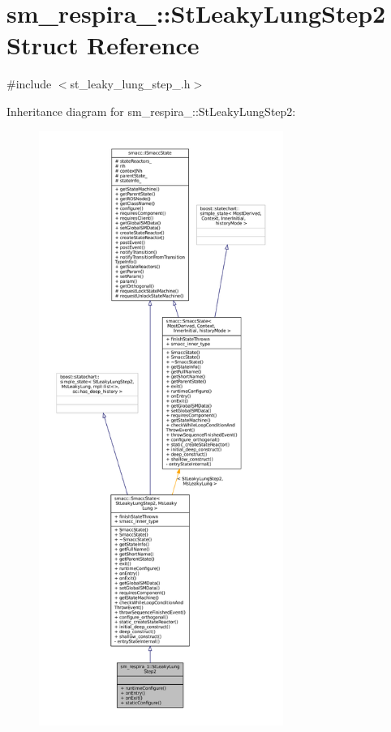 \hypertarget{structsm__respira__1_1_1StLeakyLungStep2}{}\section{sm\+\_\+respira\+\_\+:\+:St\+Leaky\+Lung\+Step2 Struct Reference}
\label{structsm__respira__1_1_1StLeakyLungStep2}


{\ttfamily \#include $<$st\+\_\+leaky\+\_\+lung\+\_\+step\+\_.\+h$>$}



Inheritance diagram for sm\+\_\+respira\+\_\+:\+:St\+Leaky\+Lung\+Step2\+:
\nopagebreak
\begin{figure}[H]
\begin{center}
\leavevmode
\includegraphics[height=550pt]{structsm__respira__1_1_1StLeakyLungStep2__inherit__graph}
\end{center}
\end{figure}


